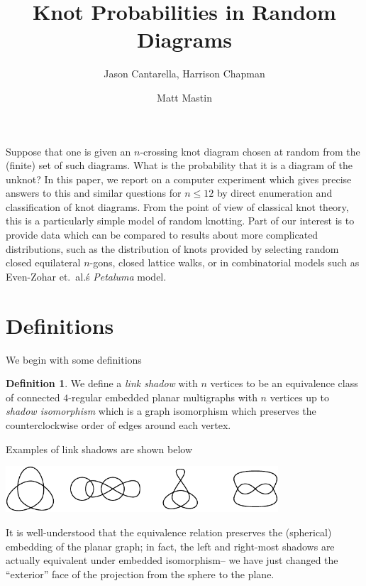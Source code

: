 \documentclass[amsmath,secnumarabic,floatfix,amssymb,nofootinbib,nobibnotes,letterpaper,11pt,tightenlines,showkeys]{revtex4}
\theoremstyle{definition}
\newtheorem{definition}[theorem]{Definition}
\begin{document}
\title[]{Knot Probabilities in Random Diagrams}
\author{Jason Cantarella, Harrison Chapman}
\noaffiliation
\author{Matt Mastin}
\noaffiliation

\maketitle

Suppose that one is given an $n$-crossing knot diagram chosen at random from the (finite) set of such diagrams. What is the probability that it is a diagram of the unknot? In this paper, we report on a computer experiment which gives precise answers to this and similar questions for $n \leq 12$ by direct enumeration and classification of knot diagrams. From the point of view of classical knot theory, this is a particularly simple model of random knotting. Part of our interest is to provide data which can be compared to results about more complicated distributions, such as the distribution of knots provided by selecting random closed equilateral $n$-gons, closed lattice walks, or in combinatorial models such as Even-Zohar et.\ al.\'s \emph{Petaluma} model.

\section{Definitions}

We begin with some definitions
\begin{definition}
We define a \emph{link shadow} with $n$ vertices to be an equivalence class of connected $4$-regular embedded planar multigraphs with $n$ vertices up to \emph{shadow isomorphism} which is a graph isomorphism which preserves the counterclockwise order of edges around each vertex.
\end{definition}

Examples of link shadows are shown below
\begin{center}
\includegraphics[width=4in]{linkshadow.pdf}
\end{center}
It is well-understood that the equivalence relation preserves the (spherical) embedding of the planar graph; in fact, the left and right-most shadows are actually equivalent under embedded isomorphism-- we have just changed the ``exterior'' face of the projection from the sphere to the plane.
\end{document}
